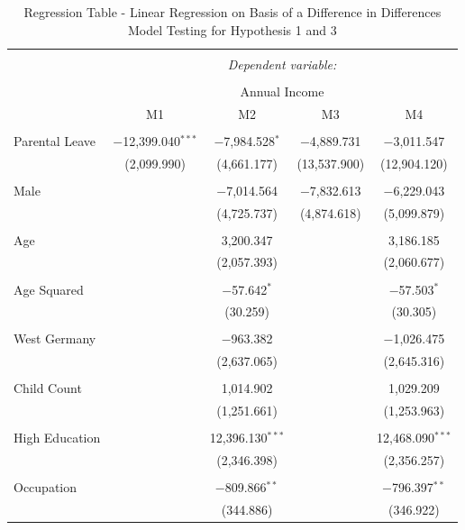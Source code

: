 \documentclass[
  12pt,
]{article}
\begin{document}
\begin{table}[!htbp] \centering 
  \caption{Regression Table - Linear Regression on Basis of a Difference in Differences Model Testing for Hypothesis 1 and 3} 
  \label{tab2} 
\footnotesize 
\begin{tabular}{@{\extracolsep{-5pt}}lcccc} 
\\[-1.8ex]\hline 
\hline \\[-1.8ex] 
 & \multicolumn{4}{c}{\textit{Dependent variable:}} \\ 
\cline{2-5} 
\\[-1.8ex] & \multicolumn{4}{c}{Annual Income} \\ 
 & M1 & M2 & M3 & M4 \\ 
\hline \\[-1.8ex] 
 Parental Leave & $-$12,399.040$^{***}$ & $-$7,984.528$^{*}$ & $-$4,889.731 & $-$3,011.547 \\ 
  & (2,099.990) & (4,661.177) & (13,537.900) & (12,904.120) \\ 
  & & & & \\ 
 Male &  & $-$7,014.564 & $-$7,832.613 & $-$6,229.043 \\ 
  &  & (4,725.737) & (4,874.618) & (5,099.879) \\ 
  & & & & \\ 
 Age &  & 3,200.347 &  & 3,186.185 \\ 
  &  & (2,057.393) &  & (2,060.677) \\ 
  & & & & \\ 
 Age Squared &  & $-$57.642$^{*}$ &  & $-$57.503$^{*}$ \\ 
  &  & (30.259) &  & (30.305) \\ 
  & & & & \\ 
 West Germany &  & $-$963.382 &  & $-$1,026.475 \\ 
  &  & (2,637.065) &  & (2,645.316) \\ 
  & & & & \\ 
 Child Count &  & 1,014.902 &  & 1,029.209 \\ 
  &  & (1,251.661) &  & (1,253.963) \\ 
  & & & & \\ 
 High Education &  & 12,396.130$^{***}$ &  & 12,468.090$^{***}$ \\ 
  &  & (2,346.398) &  & (2,356.257) \\ 
  & & & & \\ 
 Occupation &  & $-$809.866$^{**}$ &  & $-$796.397$^{**}$ \\ 
  &  & (344.886) &  & (346.922) \\ 

\end{tabular}
\end{table}
\end{document}
